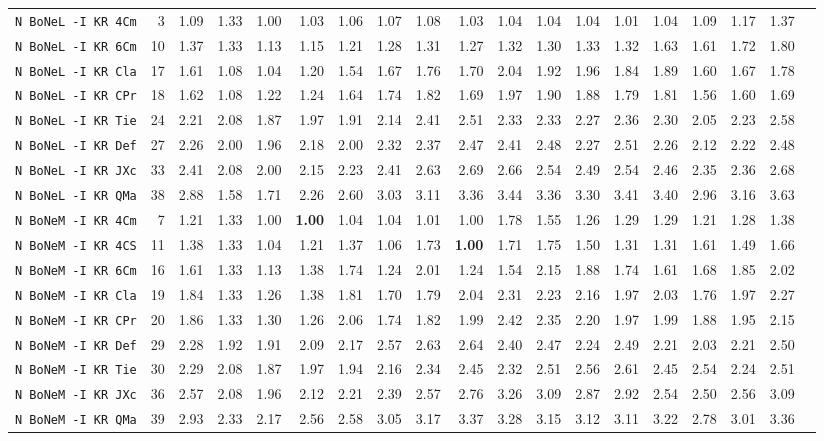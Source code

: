 \begin{tabular}{l | r @{~~} r | r@{~~}r@{~~}r@{~~}r@{~~}r@{~~}r@{~~}r@{~~}r@{~~}r@{~~}r@{~~}r@{~~}r@{~~}r@{~~}r@{~~}r@{~~}r|}
\verb+N BoNeL -I KR 4Cm+ & 3 & 1.09 & 1.33&1.00&1.03&1.06&1.07&1.08&1.03&1.04&1.04&1.04&1.01&1.04&1.09&1.17&1.37\\
\verb+N BoNeL -I KR 6Cm+ & 10 & 1.37 & 1.33&1.13&1.15&1.21&1.28&1.31&1.27&1.32&1.30&1.33&1.32&1.63&1.61&1.72&1.80\\
\verb+N BoNeL -I KR Cla+ & 17 & 1.61 & 1.08&1.04&1.20&1.54&1.67&1.76&1.70&2.04&1.92&1.96&1.84&1.89&1.60&1.67&1.78\\
\verb+N BoNeL -I KR CPr+ & 18 & 1.62 & 1.08&1.22&1.24&1.64&1.74&1.82&1.69&1.97&1.90&1.88&1.79&1.81&1.56&1.60&1.69\\
\verb+N BoNeL -I KR Tie+ & 24 & 2.21 & 2.08&1.87&1.97&1.91&2.14&2.41&2.51&2.33&2.33&2.27&2.36&2.30&2.05&2.23&2.58\\
\verb+N BoNeL -I KR Def+ & 27 & 2.26 & 2.00&1.96&2.18&2.00&2.32&2.37&2.47&2.41&2.48&2.27&2.51&2.26&2.12&2.22&2.48\\
\verb+N BoNeL -I KR JXc+ & 33 & 2.41 & 2.08&2.00&2.15&2.23&2.41&2.63&2.69&2.66&2.54&2.49&2.54&2.46&2.35&2.36&2.68\\
\verb+N BoNeL -I KR QMa+ & 38 & 2.88 & 1.58&1.71&2.26&2.60&3.03&3.11&3.36&3.44&3.36&3.30&3.41&3.40&2.96&3.16&3.63\smallskip \\
\verb+N BoNeM -I KR 4Cm+ & 7 & 1.21 & 1.33&1.00&\textbf{1.00}&1.04&1.04&1.01&1.00&1.78&1.55&1.26&1.29&1.29&1.21&1.28&1.38\\
\verb+N BoNeM -I KR 4CS+ & 11 & 1.38 & 1.33&1.04&1.21&1.37&1.06&1.73&\textbf{1.00}&1.71&1.75&1.50&1.31&1.31&1.61&1.49&1.66\\
\verb+N BoNeM -I KR 6Cm+ & 16 & 1.61 & 1.33&1.13&1.38&1.74&1.24&2.01&1.24&1.54&2.15&1.88&1.74&1.61&1.68&1.85&2.02\\
\verb+N BoNeM -I KR Cla+ & 19 & 1.84 & 1.33&1.26&1.38&1.81&1.70&1.79&2.04&2.31&2.23&2.16&1.97&2.03&1.76&1.97&2.27\\
\verb+N BoNeM -I KR CPr+ & 20 & 1.86 & 1.33&1.30&1.26&2.06&1.74&1.82&1.99&2.42&2.35&2.20&1.97&1.99&1.88&1.95&2.15\\
\verb+N BoNeM -I KR Def+ & 29 & 2.28 & 1.92&1.91&2.09&2.17&2.57&2.63&2.64&2.40&2.47&2.24&2.49&2.21&2.03&2.21&2.50\\
\verb+N BoNeM -I KR Tie+ & 30 & 2.29 & 2.08&1.87&1.97&1.94&2.16&2.34&2.45&2.32&2.51&2.56&2.61&2.45&2.54&2.24&2.51\\
\verb+N BoNeM -I KR JXc+ & 36 & 2.57 & 2.08&1.96&2.12&2.21&2.39&2.57&2.76&3.26&3.09&2.87&2.92&2.54&2.50&2.56&3.09\\
\verb+N BoNeM -I KR QMa+ & 39 & 2.93 & 2.33&2.17&2.56&2.58&3.05&3.17&3.37&3.28&3.15&3.12&3.11&3.22&2.78&3.01&3.36\smallskip \\

\end{tabular}
